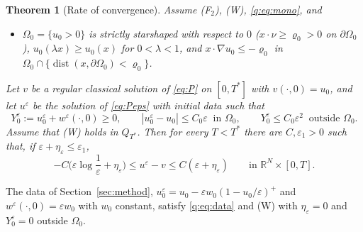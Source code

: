 \documentclass[11pt]{amsart}
\newtheorem{theorem}{Theorem}[section]
\theoremstyle{definition}
\theoremstyle{remark}
\newcommand{\ve}{\varepsilon}
\newcommand{\R}{\mathbb{R}}
\begin{document}
\begin{theorem}[Rate of convergence]\label{q:thm:rate}
Assume (F$_2$), (W), \eqref{q:eq:mono}, and
\begin{itemize}
\item[(H)] $\Omega_0=\{u_0>0\}$ is strictly starshaped with respect to $0$
($x\cdot\nu\ge\varrho_0>0$ on $\partial\Omega_0$), $u_0(\lambda x)\ge u_0(x)$ for
$0<\lambda<1$, and $x\cdot\nabla u_0\le-\varrho_0$ in
$\Omega_0\cap\{\operatorname{dist}(x,\partial\Omega_0)<\varrho_0\}$.
\end{itemize}
Let $v$ be a regular classical solution of \eqref{eq:P} on $[0,T^*]$ with $v(\cdot,0)=u_0$,
and let $u^\ve$ be the solution of \eqref{eq:Peps} with initial data such that
\begin{equation}\label{q:eq:data}
Y_0^\ve:=u_0^\ve+w^\ve(\cdot,0)\ge0,\qquad |u_0^\ve-u_0|\le C_0\ve\ \text{ in }\Omega_0,\qquad
Y_0^\ve\le C_0\ve^2\ \text{ outside }\Omega_0 .
\end{equation}
Assume that (W) holds in $Q_{T^*}$. Then for every $T<T^*$ there are $C,\ve_1>0$ such that,
if $\ve+\eta_\ve\le\ve_1$,
\[
-C\Big(\ve\log\frac1\ve+\eta_\ve\Big)\le u^\ve-v\le C(\ve+\eta_\ve)\qquad\text{in }\R^N\times[0,T].
\]
\end{theorem}

The data of Section~\ref{sec:method}, $u_0^\ve=u_0-\ve w_0(1-u_0/\ve)^+$ and
$w^\ve(\cdot,0)=\ve w_0$ with $w_0$ constant, satisfy \eqref{q:eq:data} and (W) with
$\eta_\ve=0$ and $Y_0^\ve=0$ outside $\Omega_0$.
\end{document}
